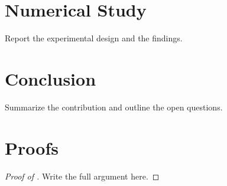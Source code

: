 \documentclass[11pt]{article}
\theoremstyle{definition}
\theoremstyle{remark}
\begin{document}
\section{Numerical Study}
\label{sec:numerical}

Report the experimental design and the findings.

\section{Conclusion}
\label{sec:conclusion}

Summarize the contribution and outline the open questions.

\appendix

\section{Proofs}
\label{sec:proofs}

\begin{proof}[Proof of ]
Write the full argument here.
\end{proof}



\end{document}
